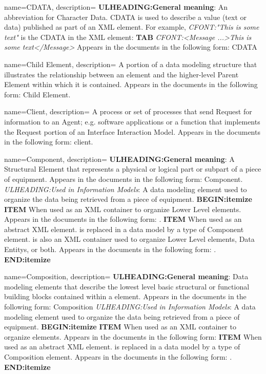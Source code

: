 {
    name={CDATA},
	description={
  \textbf{ULHEADING:General meaning}:
  An abbreviation for Character Data.
  \gls{CDATA} is used to describe a value (text or data) published as part of an XML element.
  For example, \textit{CFONT:"This is some text"} is the \gls{CDATA} in the XML element:
  \textbf{TAB} \textit{CFONT:<Message ...>This is some text</Message>}
  Appears in the documents in the following form: \gls{CDATA}
}
}

{
    name={Child Element},
	description={
  A portion of a data modeling structure that illustrates the relationship between an element and the higher-level \gls{Parent Element} within which it is contained.
  Appears in the documents in the following form: \gls{Child Element}.
}
}

{
    name={Client},
	description={
  A process or set of processes that send \gls{Request} for information to an \gls{Agent}; e.g. software applications or a function that implements the \gls{Request} portion of an \gls{Interface} \gls{Interaction Model}.
  Appears in the documents in the following form: client.
}
}

{
    name={Component},
	description={
  \textbf{ULHEADING:General meaning}:
  A \gls{Structural Element} that represents a physical or logical part or subpart of a piece of equipment.
  Appears in the documents in the following form: \gls{Component}.
  \textit{ULHEADING:Used in \gls{Information Models}}:
  A data modeling element used to organize the data being retrieved from a piece of equipment.
  \textbf{BEGIN:itemize}
      \textbf{ITEM} When used as an XML container to organize \gls{Lower Level}  elements. 
      Appears in the documents in the following form: .
      \textbf{ITEM} When used as an abstract XML element.  is replaced in a data model by a type of \gls{Component} element.  is also an XML container used to organize \gls{Lower Level}  elements, \glspl{Data Entity}, or both.
      Appears in the documents in the following form: .
  \textbf{END:itemize}
}
}

{
    name={Composition},
	description={
  \textbf{ULHEADING:General meaning}:
  Data modeling elements that describe the lowest level basic structural or functional building blocks contained within a  element.
  Appears in the documents in the following form: \gls{Composition}
  \textit{ULHEADING:Used in \gls{Information Models}}:
  A data modeling element used to organize the data being retrieved from a piece of equipment.
  \textbf{BEGIN:itemize}
      \textbf{ITEM} When used as an XML container to organize  elements. 
      Appears in the documents in the following form: 
      \textbf{ITEM} When used as an abstract XML element.  is replaced in a data model by a type of \gls{Composition} element. 
      Appears in the documents in the following form: .
  \textbf{END:itemize}
}
}

